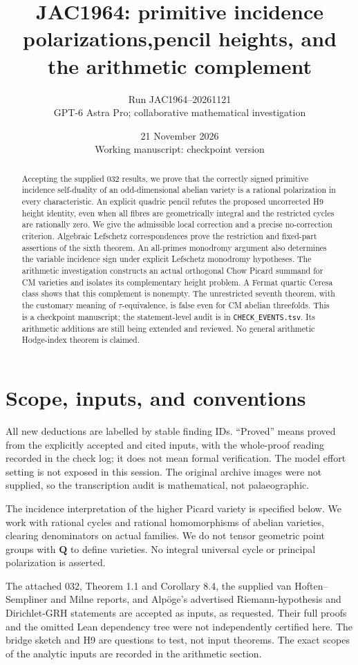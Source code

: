 \documentclass[11pt,a4paper]{article}
\title{JAC1964: primitive incidence polarizations,\newline pencil heights, and the arithmetic complement}
\author{Run JAC1964--20261121\\GPT-6 Astra Pro; collaborative mathematical investigation}
\date{21 November 2026\\Working manuscript: checkpoint version}
\begin{document}
\maketitle
\begin{abstract}
Accepting the supplied 032 results, we prove that the correctly signed
primitive incidence self-duality of an odd-dimensional abelian variety is
a rational polarization in every characteristic. An explicit quadric
pencil refutes the proposed uncorrected H9 height identity, even when
all fibres are geometrically integral and the restricted cycles are
rationally zero. We give the admissible local correction and a precise
no-correction criterion. Algebraic Lefschetz correspondences prove the
restriction and fixed-part assertions of the sixth theorem. An
all-primes monodromy argument also determines the variable incidence
sign under explicit Lefschetz monodromy hypotheses. The arithmetic
investigation constructs an actual orthogonal Chow Picard summand for
CM varieties and isolates its complementary height problem. A Fermat
quartic Ceresa class shows that this complement is nonempty.
The unrestricted seventh theorem, with the customary meaning of
$\tau$-equivalence, is false even for CM abelian threefolds.
This is a checkpoint manuscript; the statement-level audit is in
\texttt{CHECK\_EVENTS.tsv}. Its arithmetic additions are still being
extended and reviewed. No general arithmetic Hodge-index theorem is
claimed.
\end{abstract}
\tableofcontents
\newpage
\section{Scope, inputs, and conventions}
All new deductions are labelled by stable finding IDs. ``Proved'' means
proved from the explicitly accepted and cited inputs, with the
whole-proof reading recorded in the check log; it does not mean formal
verification. The model effort setting is not exposed in this session.
The original archive images were not supplied, so the transcription
audit is mathematical, not palaeographic.

The incidence interpretation of the higher Picard variety is specified
below. We work with rational cycles and rational homomorphisms of
abelian varieties, clearing denominators on actual families. We do not
tensor geometric point groups with $\mathbf Q$ to define varieties.
No integral universal cycle or principal polarization is asserted.

The attached 032, Theorem 1.1 and Corollary 8.4, the supplied
van Hoften--Sempliner and Milne reports, and Alp\"oge's advertised
Riemann-hypothesis and Dirichlet-GRH statements are accepted as inputs,
as requested. Their full proofs and the omitted Lean dependency tree
were not independently certified here. The bridge sketch and H9 are
questions to test, not input theorems. The exact scopes of the analytic
inputs are recorded in the arithmetic section.
\end{document}

